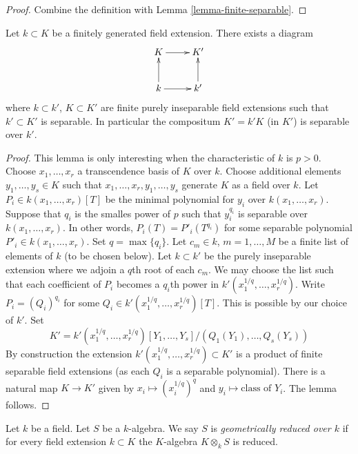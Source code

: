 \begin{proof}
Combine the definition with Lemma \ref{lemma-finite-separable}.
\end{proof}

\begin{lemma}
\label{lemma-make-separable}
Let $k \subset K$ be a finitely generated field extension.
There exists a diagram
$$
\xymatrix{
K \ar[r] & K' \\
k \ar[u] \ar[r] & k' \ar[u]
}
$$
where $k \subset k'$, $K \subset K'$ are finite purely inseparable field
extensions such that $k' \subset K'$ is separable. In particular the
compositum $K' = k'K$ (in $K'$) is separable over $k'$.
\end{lemma}

\begin{proof}
This lemma is only interesting when the characteristic of $k$ is $p > 0$.
Choose $x_1, \ldots, x_r$ a transcendence basis of $K$ over $k$.
Choose additional elements $y_1, \ldots, y_s \in K$ such that
$x_1, \ldots, x_r, y_1, \ldots, y_s$ generate $K$ as a field over $k$.
Let $P_i \in k(x_1, \ldots, x_r)[T]$ be the minimal polynomial
for $y_i$ over $k(x_1, \ldots, x_r)$.
Suppose that $q_i$ is the
smalles power of $p$ such that $y_i^{q_i}$ is separable over
$k(x_1, \ldots, x_r)$. In other words, $P_i(T) = P'_i(T^{q_i})$
for some separable polynomial $P'_i \in k(x_1, \ldots, x_r)$.
Set $q = \max\{q_i\}$.
Let $c_m \in k$, $m = 1, \ldots, M$ be a finite list of
elements of $k$ (to be chosen below).
Let $k \subset k'$ be the purely inseparable
extension where we adjoin a $q$th root of each $c_m$.
We may choose the list such that each coefficient of $P_i$ becomes
a $q_i$th power in $k'(x_1^{1/q}, \ldots, x_r^{1/q})$.
Write $P_i = (Q_i)^{q_i}$ for some
$Q_i \in k'(x_1^{1/q}, \ldots, x_r^{1/q})[T]$. This is
possible by our choice of $k'$. Set
$$
K' = k'(x_1^{1/q}, \ldots, x_r^{1/q})[Y_1, \dots, Y_s]/
(Q_1(Y_1), \ldots, Q_s(Y_s))
$$
By construction the extension $k'(x_1^{1/q}, \ldots, x_r^{1/q}) \subset K'$
is a product of finite separable field extensions (as each $Q_i$ is a
separable polynomial). There is a natural map $K \to K'$ given by
$x_i \mapsto (x_i^{1/q})^q$ and $y_i \mapsto \text{class of }Y_i$. The lemma
follows.
\end{proof}

\begin{definition}
\label{definition-geometrically-reduced}
Let $k$ be a field. Let $S$ be a $k$-algebra.
We say $S$ is {\it geometrically reduced over $k$}
if for every field extension $k \subset K$ the
$K$-algebra $K \otimes_k S$ is reduced.
\end{definition}

